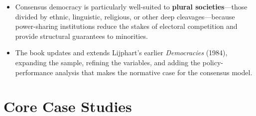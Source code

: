 \documentclass[12pt]{article}
\begin{document}
\begin{itemize}[leftmargin=*, itemsep=4pt]
    \item Consensus democracy is particularly well-suited to \textbf{plural societies}---those divided by ethnic, linguistic, religious, or other deep cleavages---because power-sharing institutions reduce the stakes of electoral competition and provide structural guarantees to minorities.
    \item The book updates and extends Lijphart's earlier \textit{Democracies} (1984), expanding the sample, refining the variables, and adding the policy-performance analysis that makes the normative case for the consensus model.
\end{itemize}

\section{Core Case Studies}
\end{document}
